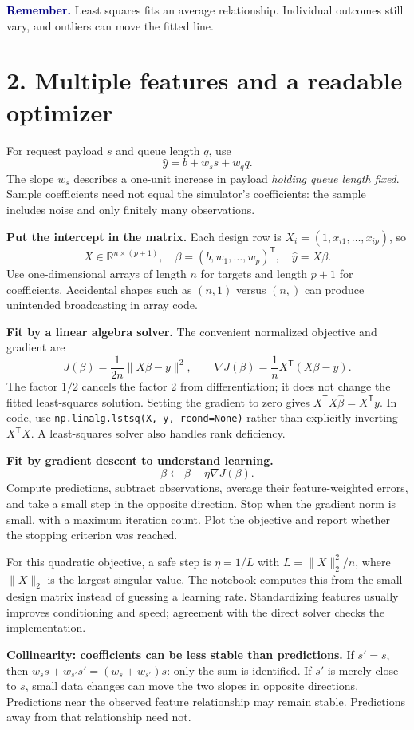 \documentclass[11pt,a4paper]{article}
\newcommand{\T}{^{\mathsf T}}
\newcommand{\code}[1]{\texttt{\small #1}}
\newcommand{\idea}[1]{\textcolor{navy}{\textbf{Remember.}} #1}
\begin{document}
\idea{Least squares fits an average relationship. Individual outcomes still
vary, and outliers can move the fitted line.}

\newpage
\section*{2. Multiple features and a readable optimizer}
For request payload $s$ and queue length $q$, use
\[
\widehat y=b+w_s s+w_q q.
\]
The slope $w_s$ describes a one-unit increase in payload \emph{holding queue
length fixed}. Sample coefficients need not equal the simulator's coefficients:
the sample includes noise and only finitely many observations.

\textbf{Put the intercept in the matrix.} Each design row is
$X_i=(1,x_{i1},\ldots,x_{ip})$, so
\[
X\in\mathbb R^{n\times(p+1)},\quad
\beta=(b,w_1,\ldots,w_p)\T,\quad
\widehat y=X\beta.
\]
Use one-dimensional arrays of length $n$ for targets and length $p+1$ for
coefficients. Accidental shapes such as $(n,1)$ versus $(n,)$ can produce
unintended broadcasting in array code.

\textbf{Fit by a linear algebra solver.}
The convenient normalized objective and gradient are
\[
J(\beta)=\frac1{2n}\|X\beta-y\|^2,\qquad
\boxed{\nabla J(\beta)=\frac1nX\T(X\beta-y).}
\]
The factor $1/2$ cancels the factor 2 from differentiation; it does not change
the fitted least-squares solution. Setting the gradient to zero gives
$X\T X\widehat\beta=X\T y$. In code, use
\code{np.linalg.lstsq(X, y, rcond=None)} rather than explicitly inverting
$X\T X$. A least-squares solver also handles rank deficiency.

\textbf{Fit by gradient descent to understand learning.}
\[
\boxed{\beta\leftarrow\beta-\eta\nabla J(\beta).}
\]
Compute predictions, subtract observations, average their feature-weighted
errors, and take a small step in the opposite direction. Stop when the gradient
norm is small, with a maximum iteration count. Plot the objective and report
whether the stopping criterion was reached.

For this quadratic objective, a safe step is $\eta=1/L$ with
$L=\|X\|_2^2/n$, where $\|X\|_2$ is the largest singular value.
The notebook computes this from the small design matrix instead of guessing a
learning rate. Standardizing features usually improves conditioning and speed;
agreement with the direct solver checks the implementation.

\textbf{Collinearity: coefficients can be less stable than predictions.}
If $s'=s$, then $w_s s+w_{s'}s'=(w_s+w_{s'})s$: only the sum is identified.
If $s'$ is merely close to $s$, small data changes can move the two slopes in
opposite directions. Predictions near the observed feature relationship may
remain stable. Predictions away from that relationship need not.
\end{document}
